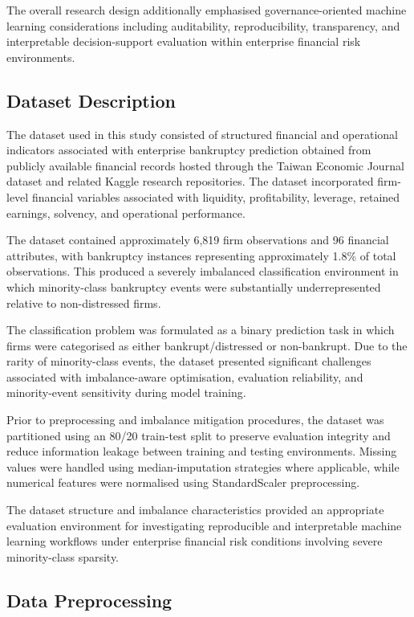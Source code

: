 \documentclass{article}
\begin{document}
The overall research design additionally emphasised governance-oriented machine learning considerations including auditability, reproducibility, transparency, and interpretable decision-support evaluation within enterprise financial risk environments.

\subsection{Dataset Description}

The dataset used in this study consisted of structured financial and operational indicators associated with enterprise bankruptcy prediction obtained from publicly available financial records hosted through the Taiwan Economic Journal dataset and related Kaggle research repositories. The dataset incorporated firm-level financial variables associated with liquidity, profitability, leverage, retained earnings, solvency, and operational performance.

The dataset contained approximately 6,819 firm observations and 96 financial attributes, with bankruptcy instances representing approximately 1.8\% of total observations. This produced a severely imbalanced classification environment in which minority-class bankruptcy events were substantially underrepresented relative to non-distressed firms.

The classification problem was formulated as a binary prediction task in which firms were categorised as either bankrupt/distressed or non-bankrupt. Due to the rarity of minority-class events, the dataset presented significant challenges associated with imbalance-aware optimisation, evaluation reliability, and minority-event sensitivity during model training.

Prior to preprocessing and imbalance mitigation procedures, the dataset was partitioned using an 80/20 train-test split to preserve evaluation integrity and reduce information leakage between training and testing environments. Missing values were handled using median-imputation strategies where applicable, while numerical features were normalised using StandardScaler preprocessing.

The dataset structure and imbalance characteristics provided an appropriate evaluation environment for investigating reproducible and interpretable machine learning workflows under enterprise financial risk conditions involving severe minority-class sparsity.

\subsection{Data Preprocessing}
\end{document}
